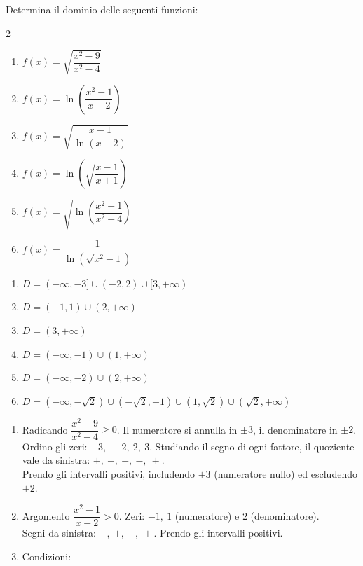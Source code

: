 \begin{question}[ID=1.5, subtitle={Dominio di funzioni complesse}, difficulty=difficile, tags={funzioni, dominio}]
Determina il dominio delle seguenti funzioni:
\begin{multicols}{2}
\begin{enumerate}[leftmargin=3.2cm]
    \item $f(x)=\sqrt{\dfrac{x^2-9}{x^2-4}}$
    \item $f(x)=\ln\left(\dfrac{x^2-1}{x-2}\right)$
    \item $f(x)=\sqrt{\dfrac{x-1}{\ln(x-2)}}$
    \item $f(x)=\ln\left(\sqrt{\dfrac{x-1}{x+1}}\right)$
    \item $f(x)=\sqrt{\ln\left(\dfrac{x^2-1}{x^2-4}\right)}$
    \item $f(x)=\dfrac{1}{\ln\left(\sqrt{x^2-1}\right)}$
\end{enumerate}
\end{multicols}
\begin{solution}
\begin{enumerate}
    \item $D=(-\infty,-3]\cup(-2,2)\cup[3,+\infty)$
    \item $D=(-1,1)\cup(2,+\infty)$
    \item $D=(3,+\infty)$
    \item $D=(-\infty,-1)\cup(1,+\infty)$
    \item $D=(-\infty,-2)\cup(2,+\infty)$
    \item $D=(-\infty,-\sqrt2)\cup(-\sqrt2,-1)\cup(1,\sqrt2)\cup(\sqrt2,+\infty)$
\end{enumerate}
\end{solution}
\begin{explanation}
\begin{enumerate}
    \item Radicando $\dfrac{x^2-9}{x^2-4}\geq 0$. Il numeratore si annulla in $\pm3$, il denominatore in $\pm2$. \\
    Ordino gli zeri: $-3,\ -2,\ 2,\ 3$. Studiando il segno di ogni fattore, il quoziente vale da sinistra: $+,\ -,\ +,\ -,\ +$. \\
    Prendo gli intervalli positivi, includendo $\pm3$ (numeratore nullo) ed escludendo $\pm2$.
    \item Argomento $\dfrac{x^2-1}{x-2}>0$. Zeri: $-1,\ 1$ (numeratore) e $2$ (denominatore). \\
    Segni da sinistra: $-,\ +,\ -,\ +$. Prendo gli intervalli positivi.
    \item Condizioni:

\end{enumerate}
\end{explanation}
\end{question}
